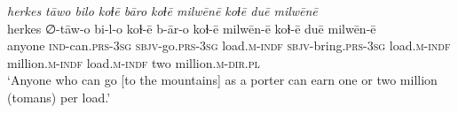 \ea \label{ŽM.61}
\textit{herkes tāwo bilo koɫē bāro koɫē milwēnē koɫē duē milwēnē} \\ 
\gll herkes ∅-tāw-o bi-l-o koɫ-ē b-ār-o koɫ-ē milwēn-ē koɫ-ē duē milwēn-ē \\ 
 anyone \textsc{ind-}can\textsc{.prs}\textsc{-3sg} \textsc{sbjv-}go\textsc{.prs}\textsc{-3sg} load\textsc{.m}\textsc{-indf} \textsc{sbjv-}bring\textsc{.prs}\textsc{-3sg} load\textsc{.m}\textsc{-indf} million\textsc{.m}\textsc{-indf} load\textsc{.m}\textsc{-indf} two million\textsc{.m}\textsc{-dir}\textsc{.pl} \\ 
\glt `Anyone who can go [to the mountains] as a porter can earn one or two million (tomans) per load.'
\z 
 

